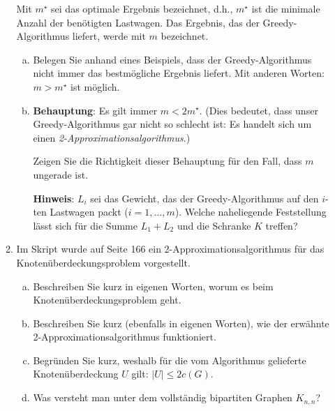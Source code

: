 \documentclass[11pt, a4paper]{article}
\begin{document}
\begin{enumerate}[\bfseries A:]
\begin{enumerate}[\bfseries 1.]
\medskip

Mit $m^\star$ sei das optimale Ergebnis bezeichnet, d.h., $m^\star$ ist die minimale Anzahl der benötigten Lastwagen. Das Ergebnis, das der Greedy-Algorithmus liefert, werde mit $m$ bezeichnet. 

\begin{enumerate}[a)]
\item Belegen Sie anhand eines Beispiels, dass der Greedy-Algorithmus nicht immer das bestmögliche Ergebnis liefert. Mit anderen Worten: $m > m^\star$ ist möglich.

\item \textbf{Behauptung}: Es gilt immer $m < 2m^\star$. (Dies bedeutet, dass unser Greedy-Algorithmus gar nicht so schlecht ist: Es handelt sich um einen \textit{2-Approximationsalgorithmus}.)

\smallskip

Zeigen Sie die Richtigkeit dieser Behauptung für den Fall, dass $m$ ungerade ist.

\textbf{Hinweis}: $L_i$ sei das Gewicht, das der Greedy-Algorithmus auf den $i$-ten Lastwagen packt ($i=1,\ldots,m$). Welche naheliegende Feststellung lässt sich für die Summe $L_1+L_2$ und die Schranke $K$ treffen?
\end{enumerate}



\item Im Skript wurde auf Seite 166 ein 2-Approximationsalgorithmus für das Knoten\-über\-deckungs\-problem vorgestellt.
\begin{enumerate}[a)]
\item Beschreiben Sie kurz in eigenen Worten, worum es beim Knotenüberdeckungsproblem geht.
\item Beschreiben Sie kurz (ebenfalls in eigenen Worten), wie der erwähnte 2-Approximations\-al\-go\-rith\-mus funktioniert.
\item Begründen Sie kurz, weshalb für die vom Algorithmus gelieferte Knotenüberdeckung $U$ gilt: $|U| \leq 2c(G)$.
\item Was versteht man unter dem vollständig bipartiten Graphen $K_{n,n}$?
\end{enumerate}

\end{enumerate}



\end{enumerate}
\end{document}
